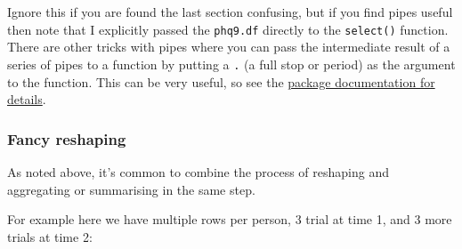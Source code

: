 \documentclass[]{article}
\newenvironment{Shaded}{\begin{snugshade}}{\end{snugshade}}
\newcommand{\KeywordTok}[1]{\textcolor[rgb]{0.13,0.29,0.53}{\textbf{#1}}}
\newcommand{\StringTok}[1]{\textcolor[rgb]{0.31,0.60,0.02}{#1}}
\newcommand{\OperatorTok}[1]{\textcolor[rgb]{0.81,0.36,0.00}{\textbf{#1}}}
\newcommand{\NormalTok}[1]{#1}
\theoremstyle{definition}
\theoremstyle{definition}
\theoremstyle{definition}
\theoremstyle{remark}
\begin{document}
{Ignore this if you are found the last section confusing, but if you
find pipes useful then note that I explicitly passed the
\texttt{phq9.df} directly to the \texttt{select()} function. There are
other tricks with pipes where you can pass the intermediate result of a
series of pipes to a function by putting a \texttt{.} (a full stop or
period) as the argument to the function. This can be very useful, so see
the \href{https://github.com/tidyverse/magrittr}{package documentation
for details}.}

\hypertarget{fancy-reshaping}{\subsubsection*{Fancy
reshaping}\label{fancy-reshaping}}

As noted above, it's common to combine the process of reshaping and
aggregating or summarising in the same step.

For example here we have multiple rows per person, 3 trial at time 1,
and 3 more trials at time 2:

\begin{Shaded}
\end{Shaded}
\end{document}
